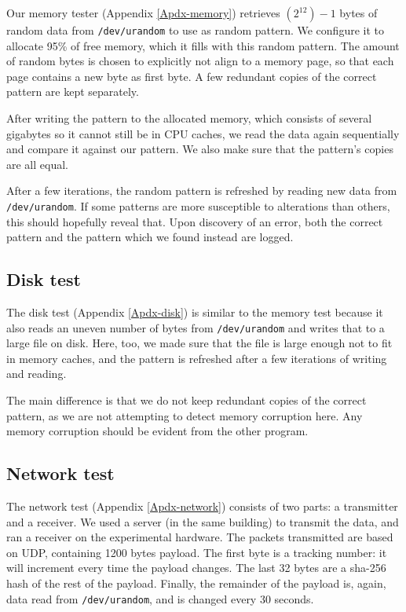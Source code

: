 \documentclass[conference]{IEEEtran}
\begin{document}
Our memory tester (Appendix \ref{Apdx-memory}) retrieves $(2^{12})-1$ bytes of
random data from \texttt{/dev/urandom} to use as random pattern. We configure
it to allocate 95\% of free memory, which it fills with this random pattern.
The amount of random bytes is chosen to explicitly not align to a memory page,
so that each page contains a new byte as first byte. A few redundant copies of
the correct pattern are kept separately.

After writing the pattern to the allocated memory, which consists of several
gigabytes so it cannot still be in CPU caches, we read the data again
sequentially and compare it against our pattern. We also make sure that the
pattern's copies are all equal.

After a few iterations, the random pattern is refreshed by reading new data
from \texttt{/dev/urandom}. If some patterns are more susceptible to
alterations than others, this should hopefully reveal that. Upon discovery of
an error, both the correct pattern and the pattern which we found instead are
logged.

\subsection{Disk test}

The disk test (Appendix \ref{Apdx-disk}) is similar to the memory test because
it also reads an uneven number of bytes from \texttt{/dev/urandom} and writes
that to a large file on disk. Here, too, we made sure that the file is large
enough not to fit in memory caches, and the pattern is refreshed after a few
iterations of writing and reading.

The main difference is that we do not keep redundant copies of the correct
pattern, as we are not attempting to detect memory corruption here. Any memory
corruption should be evident from the other program.

\subsection{Network test}

The network test (Appendix \ref{Apdx-network}) consists of two parts: a
transmitter and a receiver. We used a server (in the same building) to transmit
the data, and ran a receiver on the experimental hardware. The packets
transmitted are based on UDP, containing 1200 bytes payload. The first byte is
a tracking number: it will increment every time the payload changes. The last
32 bytes are a sha-256 hash of the rest of the payload. Finally, the remainder
of the payload is, again, data read from \texttt{/dev/urandom}, and is changed
every 30 seconds.
\end{document}
